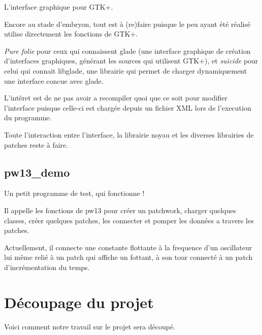 \documentclass[14pt,a4paper]{article}
\begin{document}
\par
L'interface graphique pour GTK+.
\\
\par
Encore au stade d'embryon, tout est \`a (re)faire puisque le peu
 ayant \'et\'e r\'ealis\'e utilise directement les fonctions de GTK+.
\\
\par
\textsl{Pure folie} pour ceux qui connaissent glade (une interface graphique
 de cr\'eation d'interfaces graphiques, g\'en\'erant les sources
 qui utilisent GTK+), et
\textsl{suicide} pour celui qui connait libglade, une librairie
 qui permet de charger dynamiquement une interface concue avec glade.
\\
\par
L'int\^eret est de ne pas avoir a recompiler quoi que ce soit pour
 modifier l'interface puisque celle-ci est charg\'ee depuis un
 fichier XML lors de l'execution du programme.
\\
\par
Toute l'interaction entre l'interface, la librairie noyau et les
 diverses librairies de patches reste \`a faire.


\subsection{pw13\_demo}

\par
Un petit programme de test, qui fonctionne !
\\
\par
Il appelle les fonctions de pw13 pour cr\'eer un patchwork, charger
 quelques classes, cr\'eer quelques patches, les connecter et pomper
 les donn\'ees a travers les patches.
\par
Actuellement, il connecte une constante flottante \`a la frequence
 d'un oscillateur lui m\^eme reli\'e \`a un patch qui affiche
 un fottant, \`a son tour connect\'e \`a un patch
 d'incr\'ementation du temps.

\newpage
\section{D\'ecoupage du projet}

Voici comment notre travail sur le projet sera d\'ecoup\'e.
\end{document}
